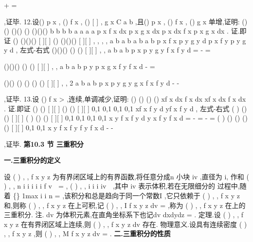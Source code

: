 +
\ge 
=





\int \int 
\int \int 
\int 
,证毕. 
12.设()
p x ,
()
f x , ()
[
]
,
g x
C a b
\in 
,且()
p x \ge 
,
()
f x , ()
g x 单增,证明: 
()
()
()()
()
()()()
b
b
b
b
a
a
a
a
p x f x dx p x g x dx
p x dx
f x p x g x dx
\le 
\int 
\int 
\int 
\int 
. 
证.即证
()
()()()
[
][
]
()
()()()
[
][
]
,
,
,
,
a b
a b
a b
a b
p x f x p y g y d
p x f
y p y g y d
\sigma 
\sigma 
\times 
\times 
\le 
\int \int 
\int \int 
, 
左式-右式
()()()
()
()
[
][
]
,
,
a b
a b
p x p y g y
f x
f
y
d\sigma 
\times 
=
-
=




\int \int 
()()()
()
()
[
][
]
,
,
a b
a b
p y p x g x
f
y
f x
d\sigma 
\times 
-
=




\int \int 
()()
()
()
()
()
[
][
]
,
,
2 a b
a b
p x p y
g y
g x
f x
f
y
d\sigma 
\times 
-
-
\le 






\int \int 
,证毕. 
13.设
()
f x >
,连续,单调减少,证明:
()
()
()
()
xf
x dx
f
x dx
xf x dx
f x dx
\le 
\int 
\int 
\int 
\int 
. 
证.即证
()
()
[
][
]
()
()
[
][
]
0,1
0,1
0,1
0,1
xf
x f
y d
yf
x f
y d
\sigma 
\sigma 
\times 
\times 
\le 
\int \int 
\int \int 
, 
左式-右式
(
)
()
()
[
][
]
(
)
()
()
[
][
]
0,1
0,1
0,1
0,1
x
y f
x f
y d
y
x f
y f x d
\sigma 
\sigma 
\times 
\times 
=
-
=
-
=
\int \int 
\int \int 
(
)
()
()
()
()
[
][
]
0,1
0,1
x
y
f x
f
y
f
y f x d\sigma 
\times 
-
-
\le 




\int \int 
,证毕. 
\vspace{6pt}
{\large \bfseries \textcolor{lyred}{第10.3 节 三重积分}}

\vspace{4pt}
{\bfseries \textcolor{lyred}{一.三重积分的定义}}

设
(
)
, ,
f x y z 为有界闭区域\Omega 上的有界函数,将\Omega 任意分成n 小块
iv
\Delta ,直径为
i\lambda , 
作和
(
)
,
,
n
i
i
i
i
i
f
v
\psi \eta 
=
\Delta 
\sum 
,
(
)
,
,
i
i
i
iv
\psi \eta 
\forall 
\in \Delta ,其中
iv
\Delta 表示体积,若在无限细分\Omega 的 
过程中,随着
\{\}
1max
i
i n
\lambda 
\lambda 
\le \le 
=
\to 
,该积分和总是趋向于同一个常数I ,它只依赖于 
(
)
, ,
f x y z 和\Omega ,则称
(
)
, ,
f x y z 在\Omega 上\textcolor{lyred}{可积},记
(
)
, ,
I
f x y z dv
\Omega 
=\int \int \int 
,称为
(
)
, ,
f x y z 
在\Omega 上的\textcolor{lyred}{三重积分}. 
\textcolor{lyred}{注}. dv 为\textcolor{lyred}{体积元素},在直角坐标系下也记dv
dxdydz
=
. 
\textcolor{lyred}{定理}.设
(
)
, ,
f x y z 在有界闭区域\Omega 上连续,则
(
)
, ,
f x y z dv
\Omega \int \int \int 
存在. 
\textcolor{lyred}{物理意义}.设\Omega 具有连续密度
(
)
, ,
f x y z ,则
(
)
, ,
M
f x y z dv
\Omega 
=\int \int \int 
. 
\vspace{4pt}
{\bfseries \textcolor{lyred}{二.三重积分的性质}}

